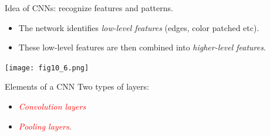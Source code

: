 \documentclass[
  10pt,
  ignorenonframetext,
  twocolumn]{beamer}
\providecommand{\tightlist}{%
  \setlength{\itemsep}{0pt}\setlength{\parskip}{0pt}}
\begin{document}
\begin{frame}{Idea of CNNs: recognize features and patterns.}
\label{idea-of-cnns-recognize-features-and-patterns.}
\vspace{2mm}

\begin{itemize}
\tightlist
\item
  The network identifies \emph{low-level features} (edges, color patched
  etc).
\end{itemize}

\vspace{2mm}

\begin{itemize}
\tightlist
\item
  These low-level features are then combined into \emph{higher-level
  features}.
\end{itemize}

\centering

\texttt{[image: fig10\_6.png]}
\end{frame}

\begin{frame}{Elements of a CNN}
\label{elements-of-a-cnn}
Two types of layers:

\begin{itemize}
\tightlist
\item
  \emph{\textcolor{red}{Convolution layers}}
\item
  \emph{\textcolor{red}{Pooling layers}}.
\end{itemize}
\end{frame}
\end{document}
